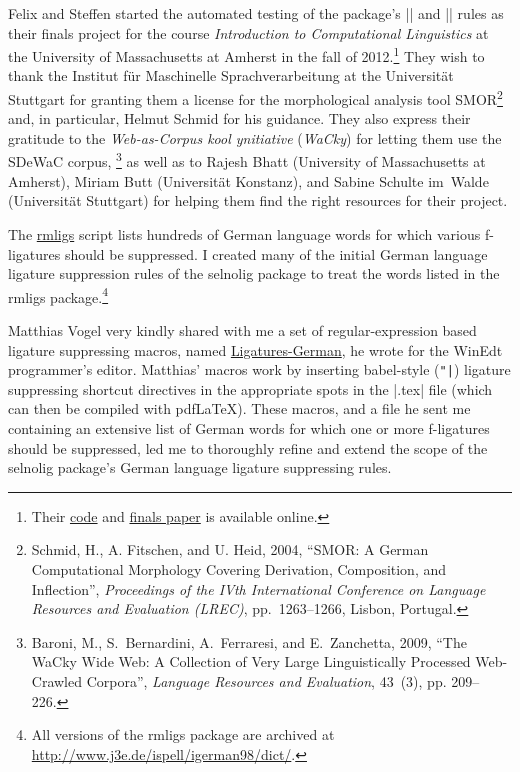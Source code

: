\documentclass[11pt]{article}
\newcommand{\pkg}[1]{\textsf{#1}}
\begin{document}
Felix and Steffen started the automated testing of the package's |\nolig| and |\keeplig| rules as their finals project for the course \emph{Introduction to Computational Linguistics} at the University of Massachusetts at Amherst in the fall of 2012.\footnote{Their \href{https://github.com/SHildebrandt/selnolig-check}{code} and \href{https://github.com/SHildebrandt/selnolig-check/blob/master/selnolig-check-documentation.pdf?raw=true}{finals paper} is available online.} They wish to thank the Institut für Maschinelle Sprachverarbeitung at the Universität Stuttgart for granting them a license for the morphological analysis tool SMOR\footnote{Schmid, H., A. Fitschen, and U. Heid, 2004, \enquote{SMOR: A German Computational Morphology Covering Derivation, Composition, and Inflection}, \emph{Proceedings of the IVth International Conference on Language Resources and Evaluation (LREC)}, pp.~1263--1266, Lisbon, Portugal.} and, in particular, Helmut Schmid for his guidance. They also express their gratitude to the \emph{Web-as-Corpus kool ynitiative} (\emph{WaCky}) for letting them use the SDeWaC corpus,%
\footnote{Baroni, M., S.~Bernardini, A.~Ferraresi, and E.~Zanchetta, 2009, \enquote{The WaCky Wide Web: A Collection of Very Large Linguistically Processed Web-Crawled Corpora}, \emph{Language Resources and Evaluation}, 43~(3), pp. 209--226.} as well as to Rajesh Bhatt (University of Massachusetts at Amherst), Miriam Butt (Universität Konstanz), and Sabine Schulte im~Walde (Universität Stuttgart) for helping them find the right resources for their project.

The \href{http://www.ctan.org/tex-archive/support/rmligs}{\pkg{rmligs}} script lists hundreds of German language words for which various f\nobreak-liga\-tures should be suppressed. I created many of the initial German language ligature suppression rules of the \pkg{selnolig} package to treat the words listed in the \pkg{rmligs} package.\footnote{All versions of the \pkg{rmligs} package are archived at \url{http://www.j3e.de/ispell/igerman98/dict/}.} 

Matthias Vogel very kindly shared with me a set of regular-expression based ligature suppressing macros, named \href{http://www.winedt.org/Macros/LaTeX/Ligatures-German.php}{Ligatures-German}, he wrote for the WinEdt programmer's editor. Matthias' macros work by inserting \pkg{babel}-style (\Verb+"|+) ligature suppressing shortcut directives in the appropriate spots in the |.tex| file (which can then be compiled with pdf\LaTeX). These macros, and a file he sent me containing an extensive list of German words for which one or more f-ligatures should be suppressed, led me to thoroughly refine and extend the scope of the \pkg{selnolig} package's German language ligature suppressing rules.
\end{document}
